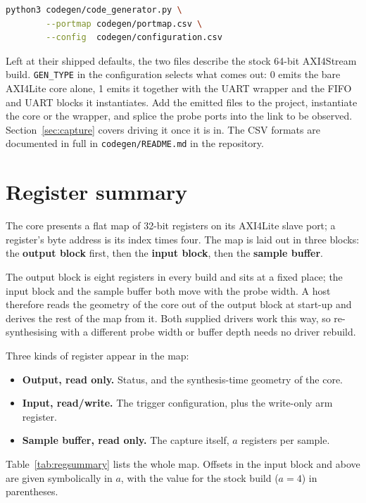 \documentclass[twocolumn]{article}
\begin{document}
\begin{lstlisting}[language=bash]
python3 codegen/code_generator.py \
        --portmap codegen/portmap.csv \
        --config  codegen/configuration.csv
\end{lstlisting}

Left at their shipped defaults, the two files describe the stock 64-bit AXI4Stream build. \texttt{GEN\_TYPE} in the configuration selects what comes out: 0 emits the bare AXI4Lite core alone, 1 emits it together with the \acs{UART} wrapper and the \ac{FIFO} and \acs{UART} blocks it instantiates. Add the emitted files to the project, instantiate the core or the wrapper, and splice the probe ports into the link to be observed. Section~\ref{sec:capture} covers driving it once it is in. The CSV formats are documented in full in \texttt{codegen/README.md} in the repository.

\newpage
\section{Register summary}
\label{sec:regsummary}
The core presents a flat map of 32-bit registers on its AXI4Lite slave port; a register's byte address is its index times four. The map is laid out in three blocks: the \textbf{output block} first, then the \textbf{input block}, then the \textbf{sample buffer}.

The output block is eight registers in every build and sits at a fixed place; the input block and the sample buffer both move with the probe width. A host therefore reads the geometry of the core out of the output block at start-up and derives the rest of the map from it. Both supplied drivers work this way, so re-synthesising with a different probe width or buffer depth needs no driver rebuild.

Three kinds of register appear in the map:

\begin{itemize}
    \item \textbf{Output, read only.} Status, and the synthesis-time geometry of the core.
    \item \textbf{Input, read/write.} The trigger configuration, plus the write-only arm register.
    \item \textbf{Sample buffer, read only.} The capture itself, $a$ registers per sample.
\end{itemize}

Table~\ref{tab:regsummary} lists the whole map. Offsets in the input block and above are given symbolically in $a$, with the value for the stock build ($a = 4$) in parentheses.
\end{document}
